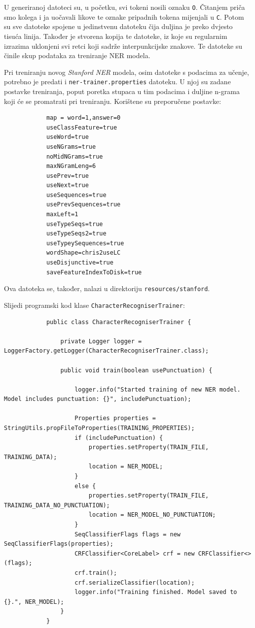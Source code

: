 \documentclass[a4paper,twoside,12pt]{memoir} %
\newcommand{\ti}[1]{\textit{#1\/}}
\begin{document}
		U generiranoj datoteci su, u početku, svi tokeni nosili oznaku \texttt{O}\@. Čitanjem priča smo kolega i ja uočavali likove te oznake pripadnih tokena mijenjali u \texttt{C}\@. Potom su sve datoteke spojene u jedinstvenu datoteku čija duljina je preko dvjesto tisuća linija. Također je stvorena kopija te datoteke, iz koje su regularnim izrazima uklonjeni svi retci koji sadrže interpunkcijske znakove. Te datoteke su činile skup podataka za treniranje NER modela.

		Pri treniranju novog \ti{Stanford NER} modela, osim datoteke s podacima za učenje, potrebno je predati i \texttt{ner-trainer.properties} datoteku. U njoj su zadane postavke treniranja, poput poretka stupaca u tim podacima i duljine n-grama koji će se promatrati pri treniranju. Korištene su preporučene postavke:

		\begin{lstlisting}
			map = word=1,answer=0
			useClassFeature=true
			useWord=true
			useNGrams=true
			noMidNGrams=true
			maxNGramLeng=6
			usePrev=true
			useNext=true
			useSequences=true
			usePrevSequences=true
			maxLeft=1
			useTypeSeqs=true
			useTypeSeqs2=true
			useTypeySequences=true
			wordShape=chris2useLC
			useDisjunctive=true
			saveFeatureIndexToDisk=true
		\end{lstlisting}

		Ova datoteka se, također, nalazi u direktoriju \texttt{resources/stanford}.

		\bigskip

		Slijedi programski kod klase \texttt{CharacterRecogniserTrainer}:

		\begin{lstlisting}
			public class CharacterRecogniserTrainer {

				private Logger logger = LoggerFactory.getLogger(CharacterRecogniserTrainer.class);

				public void train(boolean usePunctuation) {

					logger.info("Started training of new NER model. Model includes punctuation: {}", includePunctuation);

					Properties properties = StringUtils.propFileToProperties(TRAINING_PROPERTIES);
					if (includePunctuation) {
						properties.setProperty(TRAIN_FILE, TRAINING_DATA);
						location = NER_MODEL;
					}
					else {
						properties.setProperty(TRAIN_FILE, TRAINING_DATA_NO_PUNCTUATION);
						location = NER_MODEL_NO_PUNCTUATION;
					}
					SeqClassifierFlags flags = new SeqClassifierFlags(properties);
					CRFClassifier<CoreLabel> crf = new CRFClassifier<>(flags);
					crf.train();
					crf.serializeClassifier(location);
					logger.info("Training finished. Model saved to {}.", NER_MODEL);
				}
			}
		\end{lstlisting}
\end{document}
